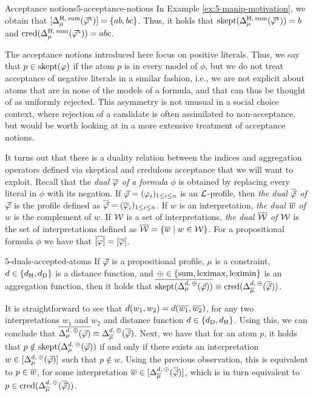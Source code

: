 \begin{xmpl}{Acceptance notions}{5-acceptance-notions}
	In Example \ref{ex:5-manip-motivation}, we obtain that 
	$[\me^{\hamming,\:\ssum}_{\mu}(\truth{\P})]=\{ab,bc\}$.
	Thus, it holds that 
	$\skept(\me^{\hamming,\:\ssum}_{\mu}(\truth{\P}))=b$ 
	and $\cred(\me^{\hamming,\:\ssum}_{\mu}(\truth{\P}))=abc$. 
\end{xmpl}

The acceptance notions introduced here focus on positive literals.
Thus, we say that $p\in\skept(\phi)$ if the atom $p$ is in every model of $\phi$,
but we do not treat acceptance of negative literals in a similar fashion,
i.e., we are not explicit about atoms that are in none of the models of a formula,
and that can thus be thought of as uniformly rejected.
This asymmetry is not unusual in a social choice context,
where rejection of a candidate is often assimilated to non-acceptance, 
but would be worth looking at 
in a more extensive treatment of acceptance notions. 

It turns out that there is a duality relation between the 
indices and aggregation operators defined via skeptical and credulous acceptance
that we will want to exploit.
Recall that the \emph{dual $\dual{\phi}$ of a formula $\phi$} is obtained
by replacing every literal in $\phi$ with its negation.
If $\P=(\phi_i)_{1\le i \le n}$ is an $\L$-profile, 
then \emph{the dual $\dual{\P}$ of $\P$} is the profile 
defined as $\dual{\P}=(\dual{\phi}_i)_{1\le i \le n}$.
If $w$ is an interpretation, 
\emph{the dual $\dual{w}$ of $w$} is the complement of $w$.
If $\W$ is a set of interpretations, 
\emph{the dual $\dual{\W}$ of $\W$} is the set of interpretations defined as
$\dual{\W}=\set{\dual{w}\mid w\in\W}$.
For a propositional formula $\phi$ we have that 
$\dual{[\phi]}=\mods{\dual{\phi}}$. 

\begin{prp}{}{5-duals-accepted-atoms}
	If $\P$ is a propositional profile, 
	$\mu$ is a constraint, 
	$\dd\in\set{\dd_\hamming, \dd_\drastic}$ is a distance function, 
	and $\agg\in\set{\ssum,\leximax,\leximin}$ is an aggregation function,
	then it holds that 
	$\dual{\skept(\me_\mu^{\dd,\:\agg}(\P))}\equiv\cred(\me^{\dd,\:\agg}_{\dual{\mu}}(\dual{\P}))$.
\end{prp}
\begin{prf*}{}{}%
	It is straightforward to see that $\dd(w_1,w_2) = \dd(\dual{w_1},\dual{w_2})$,
	for any two interpretations $w_1$ and $w_2$ and 
	distance function $\dd\in\{\dd_{\drastic},\dd_{\hamming}\}$.
	Using this, we can conclude that 
	$\dual{\me^{\dd,\:\agg}_{\mu}(\P)}\equiv \me^{\dd,\:\agg}_{\dual{\mu}}(\dual{\P})$.
	Next, we have that for an atom $p$, 
	it holds that $p\notin\skept(\me^{\dd,\:\agg}_{\mu}(\P))$ if and only if 
	there exists an interpretation $w\in\mods{\me^{\dd,\:\agg}_{\mu}(\P)}$ such that $p\notin w$.
	Using the previous observation,
	this is equivalent to $p\in\dual{w}$, for some interpretation 
	$\dual{w}\in[\me^{\dd,\:\agg}_{\dual{\mu}}(\dual{\P})]$,
	which is in turn equivalent to $p\in\cred(\me^{\dd,\:\agg}_{\dual{\mu}}(\dual{\P}))$.
\end{prf*}

